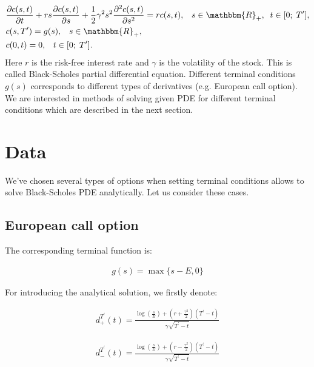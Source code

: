\documentclass[11pt,a4paper]{extarticle}
\begin{document}
\begin{equation}
	\begin{aligned}
		&\frac{\partial c(s,t)}{\partial t} + rs \frac{\partial c(s,t)}{\partial s} + \frac12 \gamma^2 s^2 \frac{\partial^2 c(s,t)}{\partial s^2} = rc(s,t),
		\;\;\;s \in \mathbbm{R}_{+},\;\; t \in [0;\;T^{\prime}],\\
		&c(s,T^{\prime}) = g(s), \;\;\; s \in \mathbbm{R}_{+},\\
		&c(0,t) = 0, \;\;\; t \in [0;\;T^{\prime}].
	\end{aligned}
\end{equation}
Here  $r$ is the risk-free interest rate and $\gamma$ is the volatility of the stock.
This is called Black-Scholes partial differential equation. Different terminal conditions $g(s)$ corresponds to different types of derivatives (e.g. European call option). We are interested in methods of solving given PDE for different terminal conditions which are described in the next section.

\section{Data}

We've chosen several types of options when setting terminal conditions allows to solve Black-Scholes PDE analytically. Let us consider these cases.

\subsection{European call option}

The corresponding terminal function is:

\begin{equation}
    \begin{aligned}
    g(s)=\max\{s-E, 0\}
    \end{aligned}
    \end{equation}

For introducing the analytical solution, we firstly denote:

\begin{equation}
    \begin{aligned}
    d_{+}^{T^\prime}(t)=\frac{\log(\frac{s}{E})+(r+\frac{\gamma^2}{2})(T^\prime-t)}{\gamma\sqrt{T^\prime-t}}
    \end{aligned}
    \end{equation}

\begin{equation}
    \begin{aligned}
    d_{-}^{T^\prime}(t)=\frac{\log(\frac{s}{E})+(r-\frac{\gamma^2}{2})(T^\prime-t)}{\gamma\sqrt{T^\prime-t}}
    \end{aligned}
    \end{equation}
\end{document}
